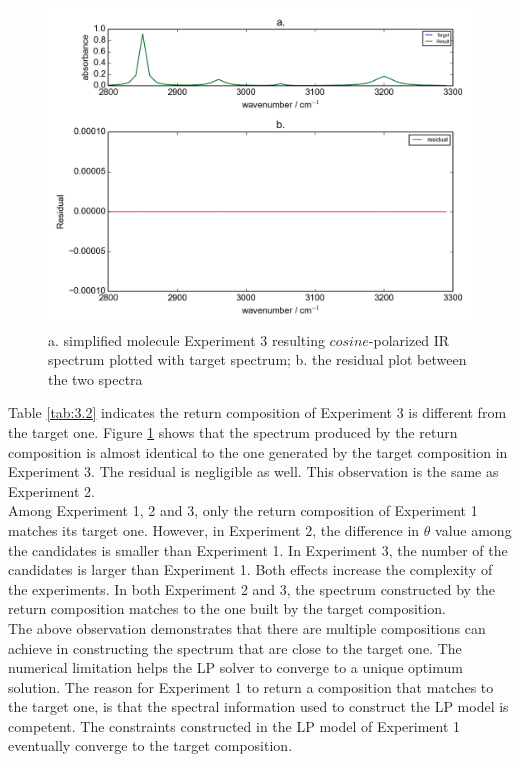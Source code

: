 \begin{figure}[!ht] 
\centering
\includegraphics[scale=0.7]{Figures/toy_model_result_plotting_ir_cos_10candi_1.png} 
\caption{a. simplified molecule Experiment 3 resulting $cosine$-polarized IR spectrum plotted with target spectrum; b. the residual plot between the two spectra}
\label{fig:3.3}
\end{figure}

Table \ref{tab:3.2} indicates the return composition of Experiment 3 is different from the target one. Figure \ref{fig:3.3} shows that the spectrum produced by the return composition is almost identical to the one generated by the target composition in Experiment 3. The residual is negligible as well. This observation is the same as Experiment 2. \\

Among Experiment 1, 2 and 3, only the return composition of Experiment 1 matches its target one. However, in Experiment 2, the difference in $\theta$ value among the candidates is smaller than Experiment 1. In Experiment 3, the number of the candidates is larger than Experiment 1. Both effects increase the complexity of the experiments. In both Experiment 2 and 3, the spectrum constructed by the return composition matches to the one built by the target composition. \\

The above observation demonstrates that there are multiple compositions can achieve in constructing the spectrum that are close to the target one. The numerical limitation helps the LP solver to converge to a unique optimum solution. The reason for Experiment 1 to return a composition that matches to the target one, is that the spectral information used to construct the LP model is competent. The constraints constructed in the LP model of Experiment 1 eventually converge to the target composition. \\ 

